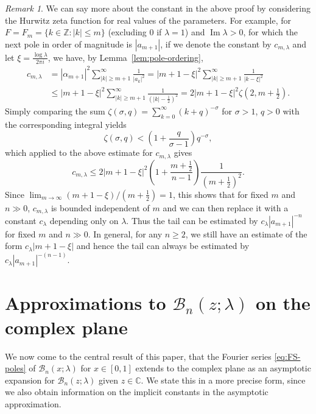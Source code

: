 \documentclass[11pt,a4paper]{amsart}
\newcommand{\Z}{\mathbb{Z}}
\newcommand{\C}{\mathbb{C}}
\newcommand{\B}{\mathcal{B}}
\renewcommand{\Im}{\operatorname{Im}}
\theoremstyle{plain}
\theoremstyle{remark}
\newtheorem{remark}{Remark}
\begin{document}
\begin{remark}
\label{rk:O-constants}
We can say more about the constant in the above proof by considering the Hurwitz zeta function for real values of the parameters. For example, for $F = F_{m} = \{ k \in \Z : |k| \leq m \}$ (excluding $0$ if $\lambda = 1$) and $\Im\lambda > 0$, for which the next pole in order of magnitude is $|a_{m+1}|$, if we denote the constant by $c_{m,\lambda}$ and let
$\xi = \frac{\log\lambda}{2\pi i}$, we have, by Lemma~\ref{lem:pole-ordering},
$$
\begin{aligned}
            c_{m,\lambda}
       &=   |\alpha_{m+1}|^{2} \sum_{|k| \geq m+1}^{\infty} \frac{1}{|a_{k}|^{2}}
	   =    |m+1 - \xi|^{2}
	        \sum_{|k| \geq m+1}^{\infty} \frac{1}{|k - \xi|^{2}}
	  \\
	  &\leq |m+1 - \xi|^{2}
	        \sum_{|k| \geq m+1}^{\infty} \frac{1}{\left(|k| - \frac{1}{2}\right)^{2}}
	   =    2 |m+1 - \xi|^{2} \zeta(2,m + \tfrac{1}{2}).
\end{aligned}
$$
Simply comparing the sum $\zeta(\sigma,q) = \sum_{k=0}^{\infty} (k + q)^{-\sigma}$
for $\sigma > 1$, $q > 0$ with the corresponding integral yields
$$
	\zeta(\sigma,q) < \left(1 + \frac{q}{\sigma - 1}\right) q^{-\sigma},
$$
which applied to the above estimate for $c_{m,\lambda}$ gives
$$
	     c_{m,\lambda}
	\leq 2 |m+1-\xi|^{2} \left(1 + \frac{m + \tfrac{1}{2}}{n-1}\right)
	     \frac{1}{\left(m + \tfrac{1}{2}\right)^{2}}.
$$
Since $\lim_{m \to \infty} (m+1-\xi)/(m+\frac{1}{2}) = 1$, this shows that for fixed $m$ and $n \gg 0$, $c_{m,\lambda}$ is bounded independent of $m$ and we can then replace it with a constant $c_{\lambda}$ depending only on $\lambda$. Thus the tail can be estimated by $c_{\lambda}|a_{m+1}|^{-n}$ for fixed $m$ and $n \gg 0$.
In general, for any $n \geq 2$, we still have an estimate of the form
$c_{\lambda} |m+1-\xi|$ and hence the tail can always be estimated by $c_{\lambda}|a_{m+1}|^{-(n-1)}$.
\end{remark}




\section{Approximations to $\B_{n}(z;\lambda)$ on the complex plane}
\label{sec:approx-AB}




We now come to the central result of this paper, that the Fourier series \eqref{eq:FS-poles} of $\B_{n}(x;\lambda)$ for $x \in [0,1]$ extends to the complex plane as an asymptotic expansion 
for $\B_{n}(z;\lambda)$ given $z \in \C$. We state this in a more precise form, since we also obtain information on the implicit constants in the asymptotic approximation.
\end{document}
